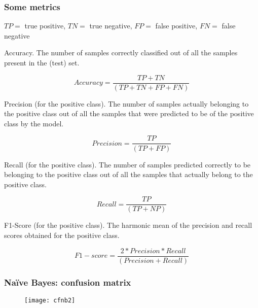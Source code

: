 \documentclass[border=5mm, convert, usenames, dvipsnames,beamer]{standalone}
\begin{document}
\begin{frame}[ fragile]{}
\frametitle{Some metrics}

\vspace{40}
\noindent

\tiny

$TP =$ true positive, $TN =$ true negative, $FP = $ false positive, $FN =$ false negative

\vspace{10}
\noindent
Accuracy. The number of samples correctly classified out of all the samples present in the (test) set.

$$
Accuracy= \frac{TP + TN}{(TP + TN +FP + FN)}
$$

\vspace{10}
\noindent
Precision (for the positive class). The number of samples actually belonging to the positive class out of all the samples that were predicted to be of the positive class by the model.

$$
Precision = \frac{TP}{(TP +FP)}
$$

\vspace{10}
\noindent
Recall (for the positive class). The number of samples predicted correctly to be belonging to the positive class out of all the samples that actually belong to the positive class.

$$
Recall = \frac{TP}{(TP +NP)}
$$

\vspace{10}
\noindent
F1-Score (for the positive class). The harmonic mean of the precision and recall scores obtained for the positive class.

$$
F1-score = \frac{2 * Precision * Recall}{(Precision + Recall)}
$$



\par



\end{frame}










\begin{frame}[ fragile]{}
\frametitle{Naïve Bayes: confusion matrix}

\vspace{40}
\noindent

\vspace{0mm}
\begin{figure}[h!]
\begin{center}
\texttt{[image: cfnb2]}
\end{center}
\end{figure}
\end{frame}
\end{document}
